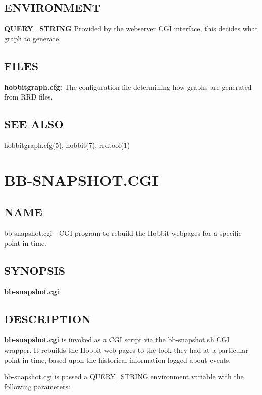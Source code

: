 \subsection{ENVIRONMENT}


 \textbf{QUERY\_STRING}
 Provided by the webserver CGI interface, this decides what graph to generate. 


 
\subsection{FILES}


 \textbf{hobbitgraph.cfg:}
 The configuration file determining how graphs are generated from RRD files. 


 
\subsection{SEE ALSO}
hobbitgraph.cfg(5), hobbit(7), rrdtool(1) 

 
%
\newpage
\section{BB-SNAPSHOT.CGI}
\subsection{NAME}
 bb-snapshot.cgi - CGI program to rebuild the Hobbit webpages for a
 specific point in time. 
\subsection{SYNOPSIS}

\textbf{bb-snapshot.cgi}


 
\subsection{DESCRIPTION}
\textbf{bb-snapshot.cgi} is invoked as a CGI script via the
bb-snapshot.sh CGI wrapper. It rebuilds the Hobbit web pages to the
look they had at a particular point in time, based upon the historical
information logged about events. 


 bb-snapshot.cgi is passed a QUERY\_STRING environment variable with the following parameters: 


